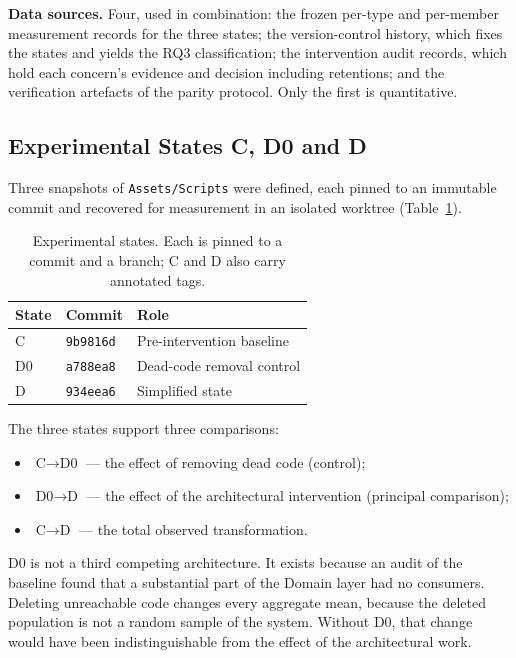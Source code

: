 \documentclass{sbc2019}%
\begin{document}
\textbf{Data sources.} Four, used in combination: the frozen per-type and
per-member measurement records for the three states; the version-control history,
which fixes the states and yields the RQ3 classification; the intervention audit
records, which hold each concern's evidence and decision including retentions; and
the verification artefacts of the parity protocol. Only the first is quantitative.

\subsection{Experimental States C, D0 and D}

Three snapshots of \texttt{Assets/Scripts} were defined, each pinned to an
immutable commit and recovered for measurement in an isolated worktree
(Table~\ref{tab:states}).

\begin{table}[htb]
\centering
\caption{Experimental states. Each is pinned to a commit and a branch; C and D
also carry annotated tags.}\label{tab:states}
\small
\begin{tabular}{llp{}}
\toprule
\textbf{State} & \textbf{Commit} & \textbf{Role} \\
\midrule
C  & \texttt{9b9816d} & Pre-intervention baseline \\
D0 & \texttt{a788ea8} & Dead-code removal control \\
D  & \texttt{934eea6} & Simplified state \\
\bottomrule
\end{tabular}
\end{table}

The three states support three comparisons:

\begin{itemize}\itemsep2pt
\item $\text{C} \rightarrow \text{D0}$ --- the effect of removing dead code (control);
\item $\text{D0} \rightarrow \text{D}$ --- the effect of the architectural intervention (principal comparison);
\item $\text{C} \rightarrow \text{D}$ --- the total observed transformation.
\end{itemize}

D0 is not a third competing architecture. It exists because an audit of the
baseline found that a substantial part of the Domain layer had no consumers.
Deleting unreachable code changes every aggregate mean, because the deleted
population is not a random sample of the system. Without D0, that change would
have been indistinguishable from the effect of the architectural work.
\end{document}
